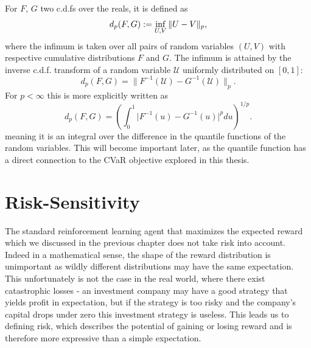 For $F$, $G$ two c.d.fs over the reals, it is defined as
\begin{equation*}
d_p(F, G) := \inf_{U, V} \| U - V \|_p,
\end{equation*}
where the infimum is taken over all pairs of random variables $(U, V)$ with respective cumulative distributions $F$ and $G$. The infimum is attained by the inverse c.d.f. transform of a random variable $\mathcal{U}$ uniformly distributed on $[0, 1]$:
\begin{equation*}
d_p(F, G) = \| F^{-1}(\mathcal{U}) - G^{-1}(\mathcal{U}) \|_p .
\end{equation*}
For $p < \infty$ this is more explicitly written as
\begin{equation}
d_p(F, G) = \left ( \int_0^1 \big | F^{-1}(u) - G^{-1}(u) \big |^p du \right )^{1/p} .
\end{equation}
meaning it is an integral over the difference in the quantile functions of the random variables. This will become important later, as the quantile function has a direct connection to the CVaR objective  explored in this thesis.




\section{Risk-Sensitivity}\label{sec:prelim:risk}

The standard reinforcement learning agent that maximizes the expected reward which we discussed in the previous chapter does not take risk into account. Indeed in a mathematical sense, the shape of the reward distribution is unimportant as wildly different distributions may have the same expectation. This unfortunately is not the case in the real world, where there exist catastrophic losses - an investment company may have a good strategy that yields profit in expectation, but if the strategy is too risky and the company's capital drops under zero this investment strategy is useless. This leads us to defining risk, which describes the potential of gaining or losing reward and is therefore more expressive than a simple expectation.

